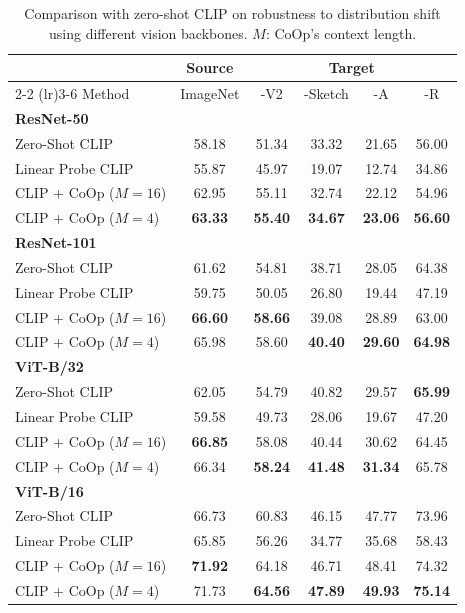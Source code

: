 \begin{table}[t]
    \tabstyle{7pt}
    \caption{Comparison with zero-shot CLIP on robustness to distribution shift using different vision backbones. $M$: CoOp's context length.}
    \label{tab:robustness_various_archs}
    \begin{tabular}{l ccccc}
    \toprule
    & Source & \multicolumn{4}{c}{Target} \\ \cmidrule(lr){2-2} \cmidrule(lr){3-6}
    Method & ImageNet & -V2 & -Sketch & -A & -R \\
    \midrule
    \textbf{ResNet-50} & \\
    Zero-Shot CLIP & 58.18 & 51.34 & 33.32 & 21.65 & 56.00 \\
    Linear Probe CLIP & 55.87 & 45.97 & 19.07 & 12.74 & 34.86 \\
    \rowcolor{tabhighlight}
    CLIP + CoOp ($M\!=\!16$) & 62.95 & 55.11 & 32.74 & 22.12 & 54.96 \\
    \rowcolor{tabhighlight}
    CLIP + CoOp ($M\!=\!4$) & \textbf{63.33} & \textbf{55.40} & \textbf{34.67} & \textbf{23.06} & \textbf{56.60} \\
    \midrule
    \textbf{ResNet-101} & \\
    Zero-Shot CLIP & 61.62 & 54.81 & 38.71 & 28.05 & 64.38 \\
    Linear Probe CLIP & 59.75&	50.05&	26.80&	19.44&	47.19 \\
    \rowcolor{tabhighlight}
    CLIP + CoOp ($M\!=\!16$) & \textbf{66.60} & \textbf{58.66} & 39.08 & 28.89 & 63.00 \\
    \rowcolor{tabhighlight}
    CLIP + CoOp ($M\!=\!4$) & 65.98 & 58.60 & \textbf{40.40} & \textbf{29.60} & \textbf{64.98} \\
    \midrule
    \textbf{ViT-B/32} & \\
    Zero-Shot CLIP & 62.05 & 54.79 & 40.82 & 29.57 & \textbf{65.99} \\
    Linear Probe CLIP & 59.58&	49.73&	28.06&	19.67&	47.20\\
    \rowcolor{tabhighlight}
    CLIP + CoOp ($M\!=\!16$) & \textbf{66.85} & 58.08 & 40.44 & 30.62 & 64.45 \\
    \rowcolor{tabhighlight}
    CLIP + CoOp ($M\!=\!4$) & 66.34 & \textbf{58.24} & \textbf{41.48} & \textbf{31.34} & 65.78 \\
    \midrule
    \textbf{ViT-B/16} & \\
    Zero-Shot CLIP & 66.73 & 60.83 & 46.15 & 47.77 & 73.96 \\
    Linear Probe CLIP & 65.85&	56.26&	34.77&	35.68&	58.43\\
    \rowcolor{tabhighlight}
    CLIP + CoOp ($M\!=\!16$) & \textbf{71.92} & 64.18 & 46.71 & 48.41 & 74.32 \\
    \rowcolor{tabhighlight}
    CLIP + CoOp ($M\!=\!4$) & 71.73 & \textbf{64.56} & \textbf{47.89} & \textbf{49.93} & \textbf{75.14} \\
    \bottomrule
    \end{tabular}
\end{table}


